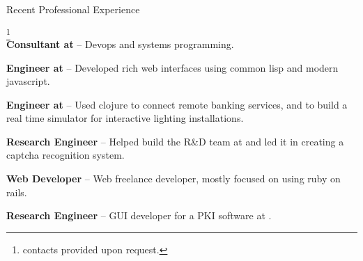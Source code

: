 \begin{rubric}{Recent Professional Experience}{ \footnote{contacts
      provided upon request.}  \\

    \entry*[2015-05 - 2015-07] \textbf{Consultant at
      } --
    Devops and systems programming.

    \entry*[2013-06 - 2015-02] \textbf{Engineer at
      } --
    Developed rich web interfaces using common lisp and modern javascript.

    \entry*[2012 - 2013-06] \textbf{Engineer at
      } --
    Used clojure to connect remote banking services, and to build a real
    time simulator for interactive lighting installations.

    \entry*[2010 - 2012] \textbf{Research Engineer} -- Helped build
    the R\&D team at 
    and led it in creating a captcha recognition system.

    \entry*[2007-2009] \textbf{Web Developer} -- Web freelance
    developer, mostly focused on using ruby on rails.

    \entry*[2005 - 2007] \textbf{Research Engineer} -- GUI developer
    for a PKI software at .

  }
\end{rubric}
